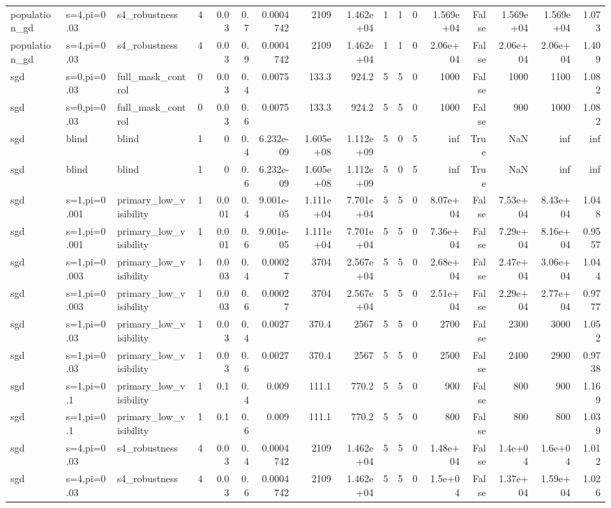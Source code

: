 \begin{tabular}{lllrrrrrrrrrrrrrr}
population_gd & s=4,pi=0.03 & s4_robustness & 4 & 0.03 & 0.7 & 0.0004742 & 2109 & 1.462e+04 & 1 & 1 & 0 & 1.569e+04 & False & 1.569e+04 & 1.569e+04 & 1.073 \\
population_gd & s=4,pi=0.03 & s4_robustness & 4 & 0.03 & 0.9 & 0.0004742 & 2109 & 1.462e+04 & 1 & 1 & 0 & 2.06e+04 & False & 2.06e+04 & 2.06e+04 & 1.409 \\
sgd & s=0,pi=0.03 & full_mask_control & 0 & 0.03 & 0.4 & 0.0075 & 133.3 & 924.2 & 5 & 5 & 0 & 1000 & False & 1000 & 1100 & 1.082 \\
sgd & s=0,pi=0.03 & full_mask_control & 0 & 0.03 & 0.6 & 0.0075 & 133.3 & 924.2 & 5 & 5 & 0 & 1000 & False & 900 & 1000 & 1.082 \\
sgd & blind & blind & 1 & 0 & 0.4 & 6.232e-09 & 1.605e+08 & 1.112e+09 & 5 & 0 & 5 & inf & True & NaN & inf & inf \\
sgd & blind & blind & 1 & 0 & 0.6 & 6.232e-09 & 1.605e+08 & 1.112e+09 & 5 & 0 & 5 & inf & True & NaN & inf & inf \\
sgd & s=1,pi=0.001 & primary_low_visibility & 1 & 0.001 & 0.4 & 9.001e-05 & 1.111e+04 & 7.701e+04 & 5 & 5 & 0 & 8.07e+04 & False & 7.53e+04 & 8.43e+04 & 1.048 \\
sgd & s=1,pi=0.001 & primary_low_visibility & 1 & 0.001 & 0.6 & 9.001e-05 & 1.111e+04 & 7.701e+04 & 5 & 5 & 0 & 7.36e+04 & False & 7.29e+04 & 8.16e+04 & 0.9557 \\
sgd & s=1,pi=0.003 & primary_low_visibility & 1 & 0.003 & 0.4 & 0.00027 & 3704 & 2.567e+04 & 5 & 5 & 0 & 2.68e+04 & False & 2.47e+04 & 3.06e+04 & 1.044 \\
sgd & s=1,pi=0.003 & primary_low_visibility & 1 & 0.003 & 0.6 & 0.00027 & 3704 & 2.567e+04 & 5 & 5 & 0 & 2.51e+04 & False & 2.29e+04 & 2.77e+04 & 0.9777 \\
sgd & s=1,pi=0.03 & primary_low_visibility & 1 & 0.03 & 0.4 & 0.0027 & 370.4 & 2567 & 5 & 5 & 0 & 2700 & False & 2300 & 3000 & 1.052 \\
sgd & s=1,pi=0.03 & primary_low_visibility & 1 & 0.03 & 0.6 & 0.0027 & 370.4 & 2567 & 5 & 5 & 0 & 2500 & False & 2400 & 2900 & 0.9738 \\
sgd & s=1,pi=0.1 & primary_low_visibility & 1 & 0.1 & 0.4 & 0.009 & 111.1 & 770.2 & 5 & 5 & 0 & 900 & False & 800 & 900 & 1.169 \\
sgd & s=1,pi=0.1 & primary_low_visibility & 1 & 0.1 & 0.6 & 0.009 & 111.1 & 770.2 & 5 & 5 & 0 & 800 & False & 800 & 800 & 1.039 \\
sgd & s=4,pi=0.03 & s4_robustness & 4 & 0.03 & 0.4 & 0.0004742 & 2109 & 1.462e+04 & 5 & 5 & 0 & 1.48e+04 & False & 1.4e+04 & 1.6e+04 & 1.012 \\
sgd & s=4,pi=0.03 & s4_robustness & 4 & 0.03 & 0.6 & 0.0004742 & 2109 & 1.462e+04 & 5 & 5 & 0 & 1.5e+04 & False & 1.37e+04 & 1.59e+04 & 1.026 \\
\bottomrule
\end{tabular}
